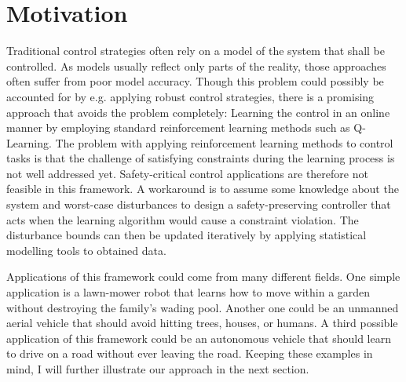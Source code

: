 \documentclass[../main.tex]{subfiles}
\begin{document}
\section{Motivation}
Traditional control strategies often rely on a model of the system that shall be controlled. As models usually reflect only parts of the reality, those approaches often suffer from poor model accuracy. Though this problem could possibly be accounted for by e.g. applying robust control strategies, there is a promising approach that avoids the problem completely: Learning the control in an online manner by employing standard reinforcement learning methods such as Q-Learning. The problem with applying reinforcement learning methods to control tasks is that the challenge of satisfying constraints during the learning process is not well addressed yet. Safety-critical control applications are therefore not feasible in this framework. A workaround is to assume some knowledge about the system and worst-case disturbances to design a safety-preserving controller that acts when the learning algorithm would cause a constraint violation. The disturbance bounds can then be updated iteratively by applying statistical modelling tools to obtained data. \par
Applications of this framework could come from many different fields. One simple application is a lawn-mower robot that learns how to move within a garden without destroying the family's wading pool. Another one could be an unmanned aerial vehicle that should avoid hitting trees, houses, or humans. A third possible application of this framework could be an autonomous vehicle that should learn to drive on a road without ever leaving the road. Keeping these examples in mind, I will further illustrate our approach in the next section.
\end{document}
